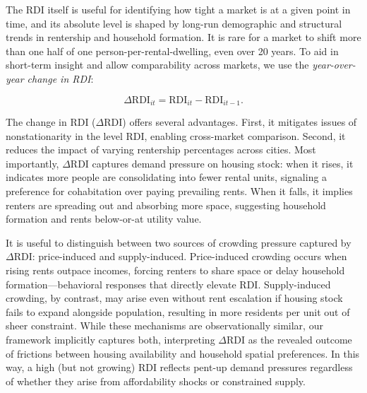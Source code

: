 \documentclass[APA,Times1COL]{WileyNJDv5} %
\begin{document}
The RDI itself is useful for identifying how tight a market is at a given point in time, and its absolute level is shaped by long-run demographic and structural trends in rentership and household formation. It is rare for a market to shift more than one half of one person-per-rental-dwelling, even over 20 years. To aid in short-term insight and allow comparability across markets, we use the \textit{year-over-year change in RDI}:

\begin{equation*}
	\Delta \text{RDI}_{it} = \text{RDI}_{it} - \text{RDI}_{it-1}.
\end{equation*}

The change in RDI (\( \Delta \text{RDI} \)) offers several advantages. First, it mitigates issues of nonstationarity in the level RDI, enabling cross-market comparison. Second, it reduces the impact of varying rentership percentages across cities. Most importantly, \( \Delta \text{RDI} \) captures demand pressure on housing stock: when it rises, it indicates more people are consolidating into fewer rental units, signaling a preference for cohabitation over paying prevailing rents. When it falls, it implies renters are spreading out and absorbing more space, suggesting household formation and rents below-or-at utility value. 

It is useful to distinguish between two sources of crowding pressure captured by $\Delta \text{RDI}$: price-induced and supply-induced. Price-induced crowding occurs when rising rents outpace incomes, forcing renters to share space or delay household formation---behavioral responses that directly elevate RDI. Supply-induced crowding, by contrast, may arise even without rent escalation if housing stock fails to expand alongside population, resulting in more residents per unit out of sheer constraint. While these mechanisms are observationally similar, our framework implicitly captures both, interpreting $\Delta \text{RDI}$ as the revealed outcome of frictions between housing availability and household spatial preferences. In this way, a high (but not growing) RDI reflects pent-up demand pressures regardless of whether they arise from affordability shocks or constrained supply.
\end{document}
